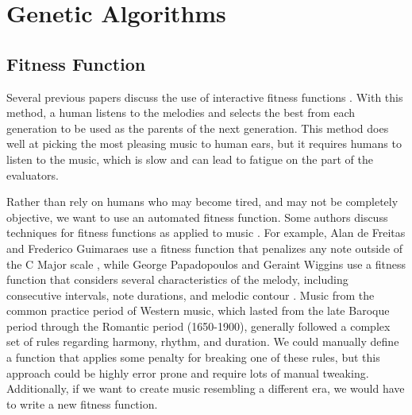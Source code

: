 \chapter{Genetic Algorithms} \label{ga}

\section{Fitness Function} \label{ga:fitness}

Several previous papers discuss the use of interactive fitness functions \cite{papadopoulos_ai_1999, mcvicar_autoguitartab:_2015}.
With this method, a human listens to the melodies and selects the best from each generation to be used as the parents of the next generation.
This method does well at picking the most pleasing music to human ears, but it requires humans to listen to the music, which is slow and can lead to fatigue on the part of the evaluators.

Rather than rely on humans who may become tired, and may not be completely objective, we want to use an automated fitness function.
Some authors discuss techniques for fitness functions as applied to music \cite{papadopoulos_ai_1999, de_freitas_originality_2011, alfonseca_fitness_2006}.
For example, Alan de Freitas and Frederico Guimaraes use a fitness function that penalizes any note outside of the C Major scale \cite{de_freitas_originality_2011}, while George Papadopoulos and Geraint Wiggins use a fitness function that considers several characteristics of the melody, including consecutive intervals, note durations, and melodic contour \cite{papadopoulos_ai_1999}.
Music from the common practice period of Western music, which lasted from the late Baroque period through the Romantic period (1650-1900), generally followed a complex set of rules regarding harmony, rhythm, and duration.
We could manually define a function that applies some penalty for breaking one of these rules, but this approach could be highly error prone and require lots of manual tweaking.
Additionally, if we want to create music resembling a different era, we would have to write a new fitness function.

